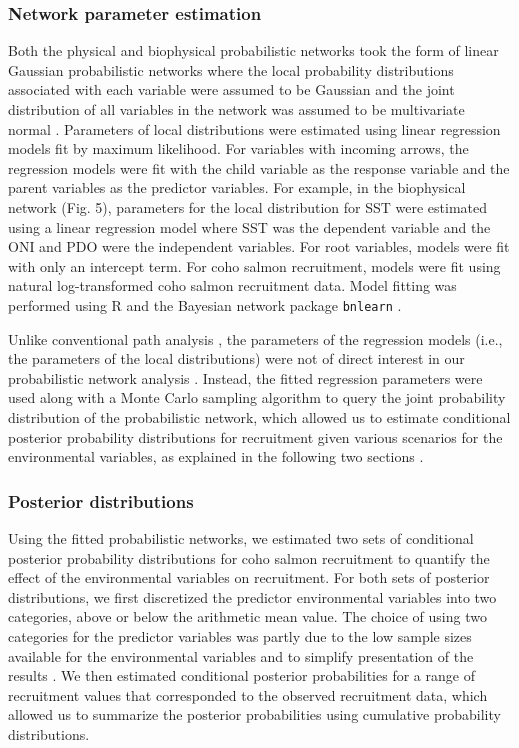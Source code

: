 \subsubsection{Network parameter estimation}

Both the physical and biophysical probabilistic networks took the form of linear
Gaussian probabilistic networks where the local probability distributions
associated with each variable were assumed to be Gaussian and the joint
distribution of all variables in the network was assumed to be multivariate
normal \citep{Shachter1989a, Koller2009a}. Parameters of local distributions
were estimated using linear regression models fit by maximum likelihood. For
variables with incoming arrows, the regression models were fit with the child
variable as the response variable and the parent variables as the predictor
variables. For example, in the biophysical network (Fig. 5), parameters for the
local distribution for SST were estimated using a linear regression model where
SST was the dependent variable and the ONI and PDO were the independent
variables. For root variables, models were fit with only an intercept term. For
coho salmon recruitment, models were fit using natural log-transformed coho
salmon recruitment data. Model fitting was performed using R and the Bayesian
network package \texttt{bnlearn} \citep{Scutari2010, Rcore2013a}.

Unlike conventional path analysis \citep{Wright1934}, the parameters of the
regression models (i.e., the parameters of the local distributions) were not of
direct interest in our probabilistic network analysis \citep{Korb2004a,
Koller2009a}. Instead, the fitted regression parameters were used along with a
Monte Carlo sampling algorithm to query the joint probability distribution of
the probabilistic network, which allowed us to estimate conditional posterior
probability distributions for recruitment given various scenarios for the
environmental variables, as explained in the following two sections
\citep{Henrion1988a}.


\subsubsection{Posterior distributions}

Using the fitted probabilistic networks, we estimated two sets of conditional
posterior probability distributions for coho salmon recruitment to quantify the
effect of the environmental variables on recruitment. For both sets of posterior
distributions, we first discretized the predictor environmental variables into
two categories, above or below the arithmetic mean value. The choice of using
two categories for the predictor variables was partly due to the low sample
sizes available for the environmental variables and to simplify presentation of
the results \citep{Koller2009a}. We then estimated conditional posterior
probabilities for a range of recruitment values that corresponded to the
observed recruitment data, which allowed us to summarize the posterior
probabilities using cumulative probability distributions.

